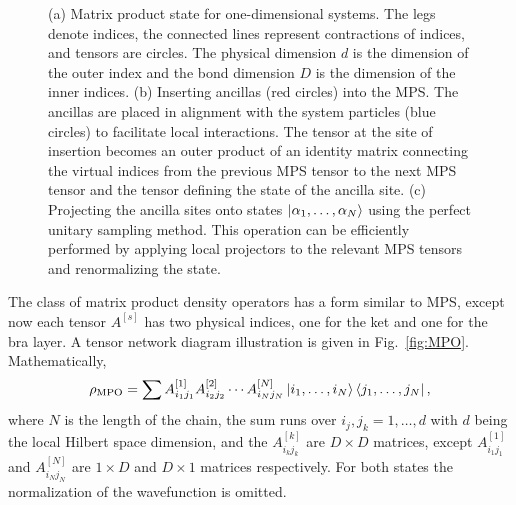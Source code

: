 \documentclass[aps,pra,twocolumn,superscriptaddress,nolongbibliography,nobalancelastpage,10pt]{revtex4-2}
\begin{document}
\begin{figure}[htbp]
\begin{tikzpicture}[inner sep=1mm]
	\end{tikzpicture}
	\caption{(a) Matrix product state for one-dimensional systems. The legs denote indices, the connected lines represent
		contractions of indices, and tensors are circles. The physical dimension $d$ is the dimension of the outer index and the bond
		dimension $D$ is the dimension of the inner indices. (b) Inserting ancillas (red circles) into the MPS. The ancillas are placed in alignment with the system particles (blue circles) to facilitate local interactions. The tensor at the site of insertion becomes an outer product of an identity matrix connecting the virtual indices from the previous MPS tensor to the next MPS tensor and the tensor defining the state of the ancilla site. (c) Projecting the ancilla sites onto states $\ket{\alpha_1, \ldots, \alpha_N}$ using the perfect unitary sampling method. This operation can be efficiently performed by applying local projectors to the relevant MPS tensors and renormalizing the state.}
	\label{fig:MPS}
\end{figure}

The class of matrix product density operators has a form similar to MPS, except now each tensor $A^{[s]}$ has two physical indices, one for the ket and one for the bra layer. A tensor network diagram illustration is given in Fig.~\ref{fig:MPO}. Mathematically,
\begin{equation}
	\rho_{\text{MPO}} = \sum A_{i_{1} j_{1}}^{[1]} A_{i_2 j_2}^{[2]} \cdots A_{i_{N} j_N}^{[N]}\ket{i_{1}, \ldots, i_{N}}\bra{j_{1}, \ldots, j_{N}},
\end{equation}
where $N$ is the length of the chain, the sum runs over $i_j,j_k = 1,\ldots,d$ with $d$ being the local Hilbert space dimension, and the $A_{i_k j_k}^{[k]}$ are $D \times D$ matrices, except $A_{i_1 j_1}^{[1]}$ and $A_{i_N j_N}^{[N]}$ are $1 \times D$ and $D \times 1$ matrices respectively.  For both states the normalization of the wavefunction is omitted.
\end{document}
